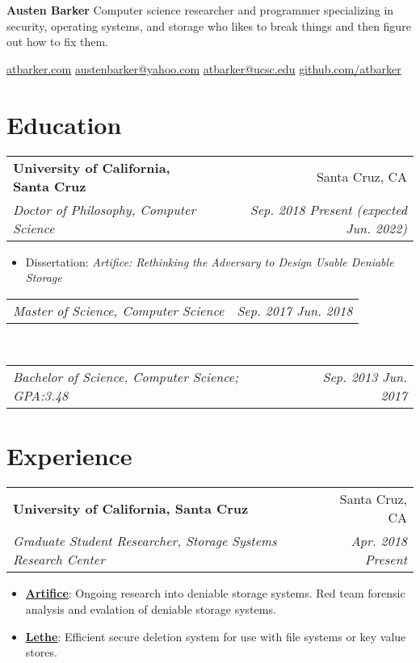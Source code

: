 \documentclass[letterpaper,10pt,oneside]{memoir}
\makeatletter
\newcommand{\resumeItem}[2]{
  \item\small{
    \textbf{#1}{: #2}
  }
}
\newcommand{\resumeSubheading}[4]{
  \vspace{1pt}%
    \begin{tabular*}{0.99\textwidth}[t]{l@{\extracolsep{\fill}}r}
      \textbf{#1} & #2 \\
      \textit{\small #3} & \textit{\small #4} \\
    \end{tabular*}
}
\newcommand{\resumeSubheadingContinue}[2]{
  \vspace{-1pt}
    \begin{tabular*}{0.99\textwidth}[t]{l@{\extracolsep{\fill}}r}
      \textit{\small #1} & \textit{\small #2} \\
    \end{tabular*}
}
\newcommand{\resumeSubHeadingListStart}{\vspace{1pt}\begin{itemize}[noitemsep,nolistsep,leftmargin=*,label={}]}
\newcommand{\resumeSubHeadingListEnd}{\end{itemize}}
\newcommand{\resumeItemListStart}{\begin{itemize}[noitemsep,nolistsep]}
\newcommand{\resumeItemListEnd}{\end{itemize}}
\makeatother
\begin{document}
\begin{minipage}[t]{0.75\textwidth}
\raggedright
    {\fontsize{30pt}{34pt}\selectfont
        \rmfamily\textbf{Austen Barker}}
    \vfill
    Computer science researcher and programmer specializing in security, operating systems, and storage who likes to break things and then figure out how to fix them.
\end{minipage}
\begin{minipage}[t]{0.25\textwidth}
\raggedleft
    \vspace{-20pt}
    \href{https://atbarker.com}{atbarker.com}
    \vfill
    \href{mailto:austenbarker@yahoo.com}{austenbarker@yahoo.com}
    \href{mailto:atbarker@ucsc.edu}{atbarker@ucsc.edu}
    \vfill
    \href{https://www.github.com/atbarker}{github.com/atbarker}
\end{minipage}

\vskip6pt

\section{Education}
    \resumeSubheading
     {University of California, Santa Cruz}{Santa Cruz, CA}
     {Doctor of Philosophy, Computer Science}{Sep. 2018 \textemdash{} Present (expected Jun. 2022)}
     \vspace{-5pt}
      \resumeSubHeadingListStart
	\item \small{Dissertation: \emph{Artifice: Rethinking the Adversary to Design Usable Deniable Storage}}
      \resumeSubHeadingListEnd
     \vspace{-5pt}
    \resumeSubheadingContinue
      {Master of Science, Computer Science}{Sep. 2017 \textemdash{} Jun. 2018}\\
    \resumeSubheadingContinue
      {Bachelor of Science, Computer Science; GPA:\@ 3.48}{Sep. 2013 \textemdash{} Jun. 2017}


\section{Experience}
    \resumeSubheading
      {University of California, Santa Cruz}{Santa Cruz, CA}
      {Graduate Student Researcher, Storage Systems Research Center}{Apr. 2018 \textemdash{} Present}
      \resumeItemListStart
        \resumeItem{\href{https://www.ssrc.ucsc.edu/proj/Artifice.html}{Artifice}}
    	  {Ongoing research into deniable storage systems. Red team forensic analysis and evalation of deniable storage systems.} 
    	\resumeItem{\href{https://www.ssrc.ucsc.edu/proj/securefs.html}{Lethe}}
    	  {Efficient secure deletion system for use with file systems or key value stores.}
      \resumeItemListEnd
\end{document}
